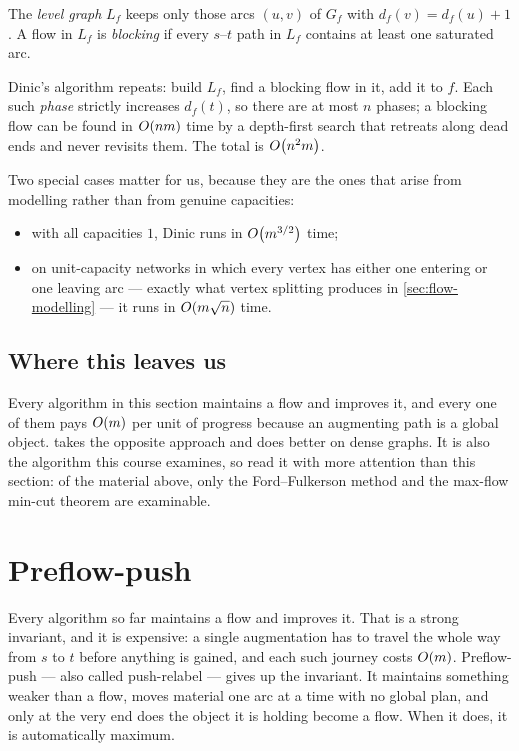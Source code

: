 \begin{definition}
The \emph{level graph} $L_f$ keeps only those arcs $(u,v)$ of $G_f$ with
$d_f(v) = d_f(u)+1$. A flow in $L_f$ is \emph{blocking} if every $s$--$t$ path
in $L_f$ contains at least one saturated arc.
\end{definition}

Dinic's algorithm repeats: build $L_f$, find a blocking flow in it, add it to
$f$. Each such \emph{phase} strictly increases $d_f(t)$, so there are at most
$n$ phases; a blocking flow can be found in $O\!\left(nm\right)$ time by a
depth-first search that retreats along dead ends and never revisits them. The
total is $O\!\left(n^2m\right)$.

Two special cases matter for us, because they are the ones that arise from
modelling rather than from genuine capacities:
\begin{itemize}[leftmargin=*]
  \item with all capacities $1$, Dinic runs in $O\!\left(m^{3/2}\right)$ time;
  \item on unit-capacity networks in which every vertex has either one
        entering or one leaving arc --- exactly what vertex splitting produces
        in \cref{sec:flow-modelling} --- it runs in $O\!\left(m\sqrt{n}\right)$ time.
\end{itemize}

\subsection{Where this leaves us}

Every algorithm in this section maintains a flow and improves it, and every one
of them pays $O\!\left(m\right)$ per unit of progress because an augmenting path is a
global object.  takes the opposite approach and does
better on dense graphs. It is also the algorithm this course examines, so read
it with more attention than this section: of the material above, only the
Ford--Fulkerson method and the max-flow min-cut theorem are examinable.

\section{Preflow-push}
\label{sec:flow-preflow-push}

Every algorithm so far maintains a flow and improves it. That is a strong
invariant, and it is expensive: a single augmentation has to travel the whole
way from $s$ to $t$ before anything is gained, and each such journey costs
$O\!\left(m\right)$. Preflow-push --- also called push-relabel --- gives up the
invariant. It maintains something weaker than a flow, moves material one arc at
a time with no global plan, and only at the very end does the object it is
holding become a flow. When it does, it is automatically maximum.

